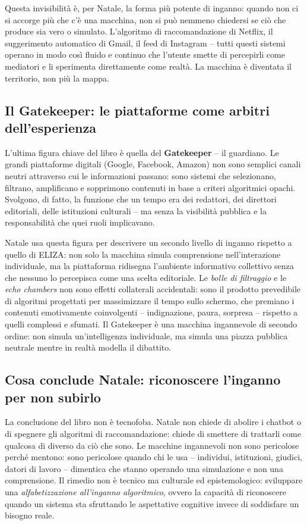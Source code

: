 \documentclass[a4paper,11pt]{article}
\begin{document}
Questa invisibilità è, per Natale, la forma più potente di inganno: quando non ci si accorge più che c'è una macchina, non si può nemmeno chiedersi se ciò che produce sia vero o simulato. L'algoritmo di raccomandazione di Netflix, il suggerimento automatico di Gmail, il feed di Instagram -- tutti questi sistemi operano in modo così fluido e continuo che l'utente smette di percepirli come mediatori e li sperimenta direttamente come realtà. La macchina è diventata il territorio, non più la mappa.

\subsection{Il Gatekeeper: le piattaforme come arbitri dell'esperienza}

L'ultima figura chiave del libro è quella del \textbf{Gatekeeper} -- il guardiano. Le grandi piattaforme digitali (Google, Facebook, Amazon) non sono semplici canali neutri attraverso cui le informazioni passano: sono sistemi che selezionano, filtrano, amplificano e sopprimono contenuti in base a criteri algoritmici opachi. Svolgono, di fatto, la funzione che un tempo era dei redattori, dei direttori editoriali, delle istituzioni culturali -- ma senza la visibilità pubblica e la responsabilità che quei ruoli implicavano.

Natale usa questa figura per descrivere un secondo livello di inganno rispetto a quello di ELIZA: non solo la macchina simula comprensione nell'interazione individuale, ma la piattaforma ridisegna l'ambiente informativo collettivo senza che nessuno lo percepisca come una scelta editoriale. Le \emph{bolle di filtraggio} e le \emph{echo chambers} non sono effetti collaterali accidentali: sono il prodotto prevedibile di algoritmi progettati per massimizzare il tempo sullo schermo, che premiano i contenuti emotivamente coinvolgenti -- indignazione, paura, sorpresa -- rispetto a quelli complessi e sfumati. Il Gatekeeper è una macchina ingannevole di secondo ordine: non simula un'intelligenza individuale, ma simula una piazza pubblica neutrale mentre in realtà modella il dibattito.

\subsection{Cosa conclude Natale: riconoscere l'inganno per non subirlo}

La conclusione del libro non è tecnofoba. Natale non chiede di abolire i chatbot o di spegnere gli algoritmi di raccomandazione: chiede di smettere di trattarli come qualcosa di diverso da ciò che sono. Le macchine ingannevoli non sono pericolose perché mentono: sono pericolose quando chi le usa -- individui, istituzioni, giudici, datori di lavoro -- dimentica che stanno operando una simulazione e non una comprensione. Il rimedio non è tecnico ma culturale ed epistemologico: sviluppare una \emph{alfabetizzazione all'inganno algoritmico}, ovvero la capacità di riconoscere quando un sistema sta sfruttando le aspettative cognitive invece di soddisfare un bisogno reale.
\end{document}
